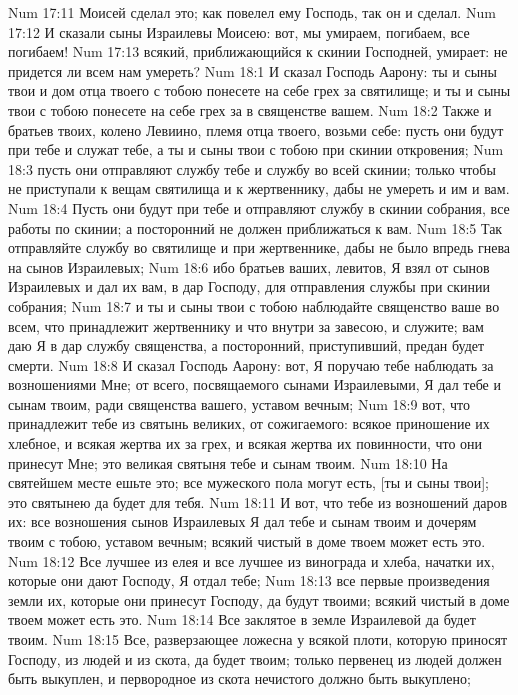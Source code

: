 \vs Num 17:11 Моисей сделал это; как повелел ему Господь, так он и сделал.
\vs Num 17:12 И сказали сыны Израилевы Моисею: вот, мы умираем, погибаем, все погибаем!
\vs Num 17:13 всякий, приближающийся к скинии Господней, умирает: не придется ли всем нам умереть?
\vs Num 18:1 И сказал Господь Аарону: ты и сыны твои и дом отца твоего с тобою понесете на себе грех за  святилище; и ты и сыны твои с тобою понесете на себе грех за  в священстве вашем.
\vs Num 18:2 Также и братьев твоих, колено Левиино, племя отца твоего, возьми себе: пусть они будут при тебе и служат тебе, а ты и сыны твои с тобою  при скинии откровения;
\vs Num 18:3 пусть они отправляют службу тебе и службу во всей скинии; только чтобы не приступали к вещам святилища и к жертвеннику, дабы не умереть и им и вам.
\vs Num 18:4 Пусть они будут при тебе и отправляют службу в скинии собрания, все работы по скинии; а посторонний не должен приближаться к вам.
\vs Num 18:5 Так отправляйте службу во святилище и при жертвеннике, дабы не было впредь гнева на сынов Израилевых;
\vs Num 18:6 ибо братьев ваших, левитов, Я взял от сынов Израилевых и дал их вам, в дар Господу, для отправления службы при скинии собрания;
\vs Num 18:7 и ты и сыны твои с тобою наблюдайте священство ваше во всем, что принадлежит жертвеннику и что внутри за завесою, и служите; вам даю Я в дар службу священства, а посторонний, приступивший, предан будет смерти.
\rsbpar\vs Num 18:8 И сказал Господь Аарону: вот, Я поручаю тебе наблюдать за возношениями Мне; от всего, посвящаемого сынами Израилевыми, Я дал тебе и сынам твоим, ради священства вашего, уставом вечным;
\vs Num 18:9 вот, что принадлежит тебе из святынь великих, от сожигаемого: всякое приношение их хлебное, и всякая жертва их за грех, и всякая жертва их повинности, что они принесут Мне; это великая святыня тебе и сынам твоим.
\vs Num 18:10 На святейшем месте ешьте это; все мужеского пола могут есть, [ты и сыны твои]; это святынею да будет для тебя.
\vs Num 18:11 И вот, что тебе из возношений даров их: все возношения сынов Израилевых Я дал тебе и сынам твоим и дочерям твоим с тобою, уставом вечным; всякий чистый в доме твоем может есть это.
\vs Num 18:12 Все лучшее из елея и все лучшее из винограда и хлеба, начатки их, которые они дают Господу, Я отдал тебе;
\vs Num 18:13 все первые произведения земли их, которые они принесут Господу, да будут твоими; всякий чистый в доме твоем может есть это.
\vs Num 18:14 Все заклятое в земле Израилевой да будет твоим.
\vs Num 18:15 Все, разверзающее ложесна у всякой плоти, которую приносят Господу, из людей и из скота, да будет твоим; только первенец из людей должен быть выкуплен, и первородное из скота нечистого должно быть выкуплено;

